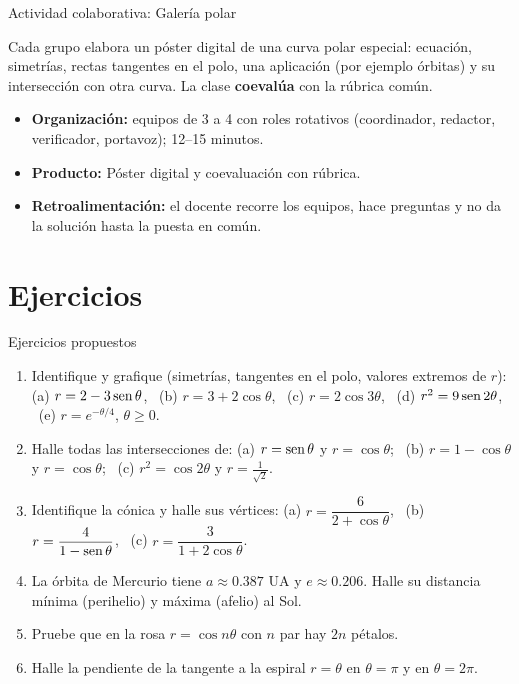 \documentclass[10pt,aspectratio=169]{beamer}
\begin{document}
\begin{frame}{Actividad colaborativa: Galería polar}
  \small
  \begin{activa}
    Cada grupo elabora un póster digital de una curva polar especial: ecuación, simetrías, rectas tangentes en el polo, una aplicación (por ejemplo órbitas) y su intersección con otra curva. La clase \textbf{coevalúa} con la rúbrica común.
  \end{activa}
  \begin{itemize}
    \item \textbf{Organización:} equipos de 3 a 4 con roles rotativos (coordinador, redactor, verificador, portavoz); 12--15 minutos.
    \item \textbf{Producto:} Póster digital y coevaluación con rúbrica.
    \item \textbf{Retroalimentación:} el docente recorre los equipos, hace preguntas y no da la solución hasta la puesta en común.
  \end{itemize}
\end{frame}

\section{Ejercicios}

\begin{frame}{Ejercicios propuestos}
  \small
  \begin{ejercicio}
    \begin{enumerate}
      \item Identifique y grafique (simetrías, tangentes en el polo, valores extremos de $r$):
        (a) $r=2-3\operatorname{sen}\theta$, \ (b) $r=3+2\cos\theta$, \ (c) $r=2\cos3\theta$, \ (d) $r^2=9\operatorname{sen}2\theta$, \ (e) $r=e^{-\theta/4}$, $\theta\ge0$.
      \item Halle todas las intersecciones de: (a) $r=\operatorname{sen}\theta$ y $r=\cos\theta$; \ (b) $r=1-\cos\theta$ y $r=\cos\theta$; \ (c) $r^2=\cos2\theta$ y $r=\frac{1}{\sqrt2}$.
      \item Identifique la cónica y halle sus vértices: (a) $r=\dfrac{6}{2+\cos\theta}$, \ (b) $r=\dfrac{4}{1-\operatorname{sen}\theta}$, \ (c) $r=\dfrac{3}{1+2\cos\theta}$.
      \item La órbita de Mercurio tiene $a\approx0.387$ UA y $e\approx0.206$. Halle su distancia mínima (perihelio) y máxima (afelio) al Sol.
      \item Pruebe que en la rosa $r=\cos n\theta$ con $n$ par hay $2n$ pétalos.
      \item Halle la pendiente de la tangente a la espiral $r=\theta$ en $\theta=\pi$ y en $\theta=2\pi$.
    \end{enumerate}
  \end{ejercicio}
\end{frame}
\end{document}
